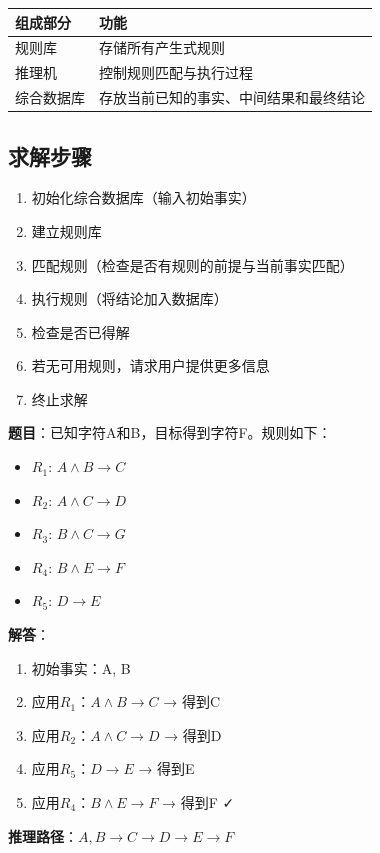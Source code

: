 \begin{table}[htbp]
\centering\small
\begin{tabular}{ll}
\toprule
\textbf{组成部分} & \textbf{功能} \\
\midrule
规则库 & 存储所有产生式规则 \\
推理机 & 控制规则匹配与执行过程 \\
综合数据库 & 存放当前已知的事实、中间结果和最终结论 \\
\bottomrule
\end{tabular}
\end{table}

\subsection{求解步骤}
\begin{enumerate}[leftmargin=2em,itemsep=0pt]
    \item 初始化综合数据库（输入初始事实）
    \item 建立规则库
    \item 匹配规则（检查是否有规则的前提与当前事实匹配）
    \item 执行规则（将结论加入数据库）
    \item 检查是否已得解
    \item 若无可用规则，请求用户提供更多信息
    \item 终止求解
\end{enumerate}

\begin{examplebox}[例题2.1 产生式推理]
\textbf{题目}：已知字符A和B，目标得到字符F。规则如下：
\begin{itemize}[itemsep=0pt]
    \item $R_1$: $A \land B \to C$
    \item $R_2$: $A \land C \to D$
    \item $R_3$: $B \land C \to G$
    \item $R_4$: $B \land E \to F$
    \item $R_5$: $D \to E$
\end{itemize}
\tcblower
\textbf{解答}：
\begin{enumerate}[itemsep=0pt]
    \item 初始事实：A, B
    \item 应用$R_1$：$A \land B \to C$ → 得到C
    \item 应用$R_2$：$A \land C \to D$ → 得到D
    \item 应用$R_5$：$D \to E$ → 得到E
    \item 应用$R_4$：$B \land E \to F$ → 得到F ✓
\end{enumerate}
\textbf{推理路径}：$A,B \to C \to D \to E \to F$
\end{examplebox}

